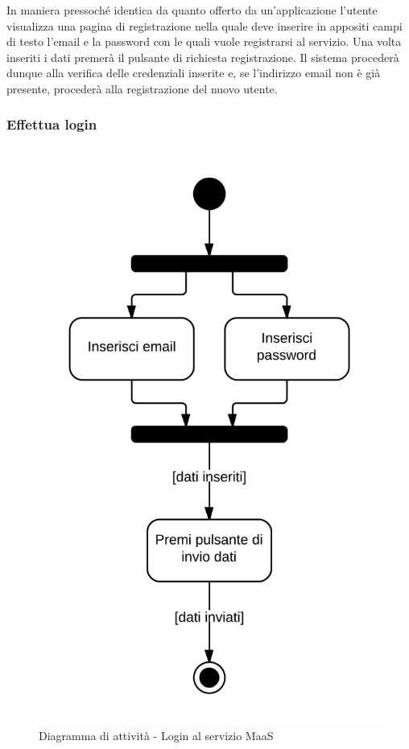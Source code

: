 In maniera pressoché identica da quanto offerto da un'applicazione  l'utente visualizza una pagina di registrazione nella quale deve inserire in appositi campi di testo l'email e la password con le quali vuole registrarsi al servizio. Una volta inseriti i dati premerà il pulsante di richiesta registrazione. Il sistema procederà dunque alla verifica delle credenziali inserite e, se l'indirizzo email non è già presente, procederà alla registrazione del nuovo utente.

\subsubsection{Effettua login}

\begin{figure}[H]
\centering
\includegraphics[scale=0.1]{uml/MaaP - Effettua login.png}
\caption{Diagramma di attività - Login al servizio MaaS}
\end{figure}

